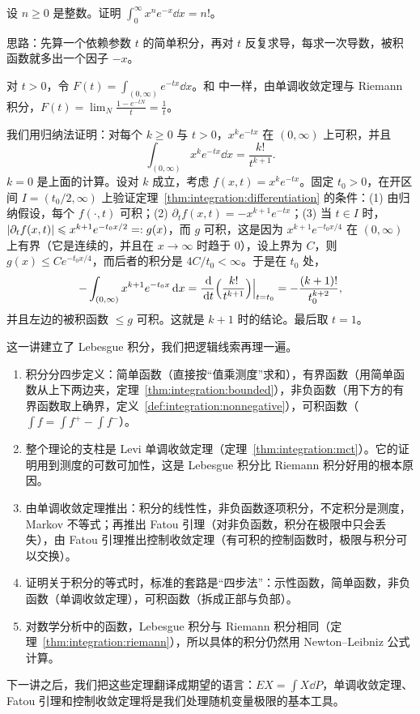 \begin{workedexample}\label{we:integration:factorial}
设 $n\geqslant0$ 是整数。证明 $\displaystyle\int_0^\infty x^ne^{-x}\dd x=n!$。
\end{workedexample}
\begin{solution}
思路：先算一个依赖参数 $t$ 的简单积分，再对 $t$ 反复求导，每求一次导数，被积函数就多出一个因子 $-x$。

对 $t>0$，令 $F(t)=\int_{(0,\infty)}e^{-tx}\dd x$。和 中一样，由单调收敛定理与 Riemann 积分，$F(t)=\lim_N\frac{1-e^{-tN}}t=\frac1t$。

我们用归纳法证明：对每个 $k\geqslant0$ 与 $t>0$，$x^ke^{-tx}$ 在 $(0,\infty)$ 上可积，并且
\[
\int_{(0,\infty)}x^ke^{-tx}\dd x=\frac{k!}{t^{k+1}} .
\]
$k=0$ 是上面的计算。设对 $k$ 成立，考虑 $f(x,t)=x^ke^{-tx}$。固定 $t_0>0$，在开区间 $I=(t_0/2,\infty)$ 上验证定理~\ref{thm:integration:differentiation} 的条件：(1) 由归纳假设，每个 $f(\cdot,t)$ 可积；(2) $\partial_tf(x,t)=-x^{k+1}e^{-tx}$；(3) 当 $t\in I$ 时，$\lvert \partial_tf(x,t)\rvert\leqslant x^{k+1}e^{-t_0x/2}=:g(x)$，而 $g$ 可积，这是因为 $x^{k+1}e^{-t_0x/4}$ 在 $(0,\infty)$ 上有界（它是连续的，并且在 $x\to\infty$ 时趋于 $0$），设上界为 $C$，则 $g(x)\leqslant Ce^{-t_0x/4}$，而后者的积分是 $4C/t_0<\infty$。于是在 $t_0$ 处，
\[
-\int_{(0,\infty)}x^{k+1}e^{-t_0x}\,\mathrm{d} x=\frac{\,\mathrm{d}}{\,\mathrm{d} t}\Bigl(\frac{k!}{t^{k+1}}\Bigr)\Big|_{t=t_0}=-\frac{(k+1)!}{t_0^{k+2}} ,
\]
并且左边的被积函数 $\leqslant g$ 可积。这就是 $k+1$ 时的结论。最后取 $t=1$。
\end{solution}


这一讲建立了 Lebesgue 积分，我们把逻辑线索再理一遍。
\begin{enumerate}
\item 积分分四步定义：简单函数（直接按“值乘测度”求和），有界函数（用简单函数从上下两边夹，定理~\ref{thm:integration:bounded}），非负函数（用下方的有界函数取上确界，定义~\ref{def:integration:nonnegative}），可积函数（$\int f=\int f^+-\int f^-$）。
\item 整个理论的支柱是 Levi 单调收敛定理（定理~\ref{thm:integration:mct}）。它的证明用到测度的可数可加性，这是 Lebesgue 积分比 Riemann 积分好用的根本原因。
\item 由单调收敛定理推出：积分的线性性，非负函数逐项积分，不定积分是测度，Markov 不等式；再推出 Fatou 引理（对非负函数，积分在极限中只会丢失），由 Fatou 引理推出控制收敛定理（有可积的控制函数时，极限与积分可以交换）。
\item 证明关于积分的等式时，标准的套路是“四步法”：示性函数，简单函数，非负函数（单调收敛定理），可积函数（拆成正部与负部）。
\item 对数学分析中的函数，Lebesgue 积分与 Riemann 积分相同（定理~\ref{thm:integration:riemann}），所以具体的积分仍然用 Newton--Leibniz 公式计算。
\end{enumerate}
下一讲之后，我们把这些定理翻译成期望的语言：$EX=\int X\dd P$，单调收敛定理、Fatou 引理和控制收敛定理将是我们处理随机变量极限的基本工具。

